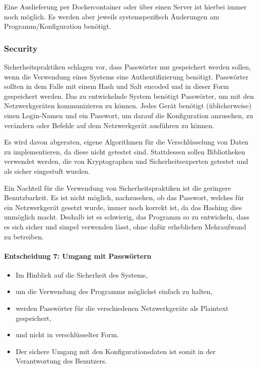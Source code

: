 \documentclass[]{subfiles}
\begin{document}
		Eine Auslieferung per Dockercontainer oder über einen Server ist hierbei immer noch möglich. 
		Es werden aber jeweils systemspezifisch Änderungen am Programm/Konfiguration benötigt.
		\newpage

		\subsubsection{Security}
		Sicherheitspraktiken schlagen vor, dass Passwörter nur gespeichert werden sollen, wenn die Verwendung eines Systems eine Authentifizierung benötigt.
		Passwörter sollten in dem Falle mit einem Hash und Salt encoded und in dieser Form gespeichert werden. 
		Das zu entwickelnde System benötigt Passwörter, um mit den Netzwerkgeräten kommunizieren zu können. 
		Jedes Gerät benötigt (üblicherweise) einen Login-Namen und ein Passwort, um darauf die Konfiguration anzusehen, zu verändern oder Befehle auf dem Netzwerkgerät ausführen zu können.

		Es wird davon abgeraten, eigene Algorithmen für die Verschlüsselung von Daten zu implementieren, da diese nicht getestet sind. 
		Stattdessen sollen Bibliotheken verwendet werden, die von Kryptographen und Sicherheitsexperten getestet und als sicher eingestuft wurden.

		Ein Nachteil für die Verwendung von Sicherheitspraktiken ist die geringere Benutzbarkeit.
		Es ist nicht möglich, nachzusehen, ob das Passwort, welches für ein Netzwerkgerät gesetzt wurde, immer noch korrekt ist, da das Hashing dies unmöglich macht.
		Deshalb ist es schwierig, das Programm so zu entwickeln, dass es sich sicher und simpel verwenden lässt, ohne dafür erheblichen Mehraufwand zu betreiben.

		\paragraph{Entscheidung 7: Umgang mit Passwörtern}
		\begin{itemize}
			\item Im Hinblick auf die Sicherheit des Systems,
			\item um die Verwendung des Programms möglichst einfach zu halten,
			\item werden Passwörter für die verschiedenen Netzwerkgeräte als Plaintext gespeichert,
			\item und nicht in verschlüsselter Form.
			\item Der sichere Umgang mit den Konfigurationsdaten ist somit in der Verantwortung des Benutzers.
		\end{itemize}
\end{document}

